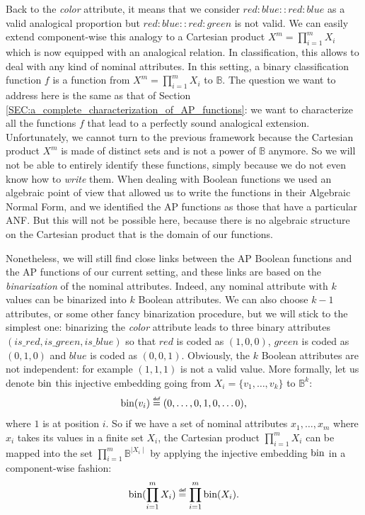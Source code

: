 Back to the \textit{color} attribute, it means that we consider
$red:blue::red:blue$ as a valid analogical proportion but $red:blue::red:green$
is not valid. We can easily extend component-wise this analogy to a Cartesian
product $X^m=\prod_{i=1}^m X_i$ which is now equipped with an analogical
relation. In classification, this allows to deal with any kind of nominal
attributes.  In this setting, a binary classification function $f$ is a
function from $X^m=\prod_{i=1}^m X_i$ to $\mathbb{B}$. The question we want to
address here is the same as that of Section
\ref{SEC:a_complete_characterization_of_AP_functions}: we want to characterize all
the functions $f$ that lead to a perfectly sound analogical extension.
Unfortunately, we cannot turn to the previous framework because the Cartesian
product $X^m$ is made of distinct sets and is not a power of
$\mathbb{B}$ anymore. So we will not be able to entirely identify these functions,
simply because we do not even know how to \textit{write} them. When dealing
with Boolean functions we used an algebraic point of view that allowed us
to write the functions in their Algebraic Normal Form, and we identified the AP
functions as those that have a particular ANF. But this will not be
possible here, because there is no algebraic structure on the Cartesian product that
is the domain of our functions.

Nonetheless, we will still find close links between the AP Boolean functions
and the AP functions of our current setting, and these links are based on the
\textit{binarization} of the nominal attributes. Indeed, any nominal attribute
with $k$ values can be binarized into $k$ Boolean attributes. We can also choose
$k- 1$ attributes, or some other fancy binarization procedure, but we will
stick to the simplest one:
binarizing the \textit{color} attribute leads to three binary attributes
$(is\_red, is\_green, is\_blue)$ so that $red$ is coded as $(1, 0, 0)$,
$green$ is coded as $(0, 1 , 0)$ and $blue$ is coded as $(0, 0, 1)$. Obviously,
the $k$ Boolean attributes are not independent: for example $(1, 1, 1)$  is not
a valid value.  More formally, let us denote $\text{bin}$ this injective embedding
going from $X_i=\{v_1, \dots, v_k\}$ to $\mathbb{B}^k$:
$$\bin(v_i) \eqdef (0, \dots, 0, 1, 0, \dots 0),$$
where $1$ is at position $i$.  So if we have a set of nominal attributes $x_1,
\dots, x_m$ where $x_i$ takes its values in a finite set $X_i$, the Cartesian
product  $\prod_{i=1}^m X_i$ can be mapped into the set $\prod_{i=1}^m
\mathbb{B}^{\mid X_i \mid}$ by applying the injective embedding $\text{bin}$ in a
component-wise fashion:
$$\bin(\prod_{i=1}^m X_i) \eqdef \prod_{i=1}^m  \bin(X_i).$$


